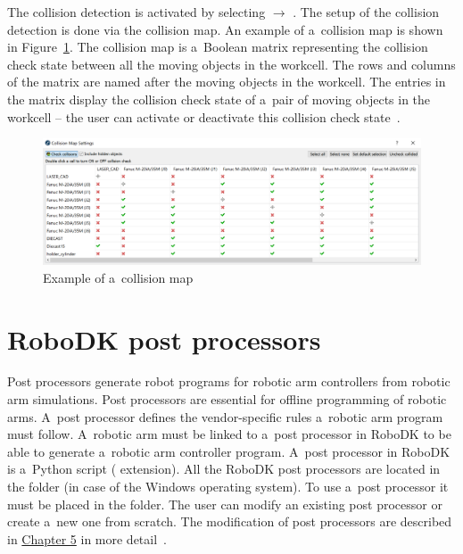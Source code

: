 The collision detection is activated by selecting  $\rightarrow$ . The setup of the collision detection is done via the collision map. An example of a~collision map is shown in Figure~\ref{fig:collisionmap}. The collision map is a~Boolean matrix representing the collision check state between all the moving objects in the workcell. The rows and columns of the matrix are named after the moving objects in the workcell. The entries in the matrix display the collision check state of a~pair of moving objects in the workcell -- the user can activate or deactivate this collision check state~\cite{robodkcollision}.

\begin{figure}[h]
    \centering
    \includegraphics[width=1.0\linewidth]{img/collision_map.PNG}
    \caption{Example of a~collision map}
    \label{fig:collisionmap}
\end{figure}

\section{RoboDK post processors}

Post processors generate robot programs for robotic arm controllers from robotic arm simulations. Post processors are essential for offline programming of robotic arms. A~post processor defines the vendor-specific rules a~robotic arm program must follow. A~robotic arm must be linked to a~post processor in RoboDK to be able to generate a~robotic arm controller program. A~post processor in RoboDK is a~Python script ( extension). All the RoboDK post processors are located in the
 folder (in case of the Windows operating system).  To use a~post processor it must be placed in the  folder. The user can modify an existing post processor or create a~new one from scratch. The modification of post processors are described in \hyperref[chap:implementation]{Chapter 5} in more detail~\cite{robodkposts}. 
